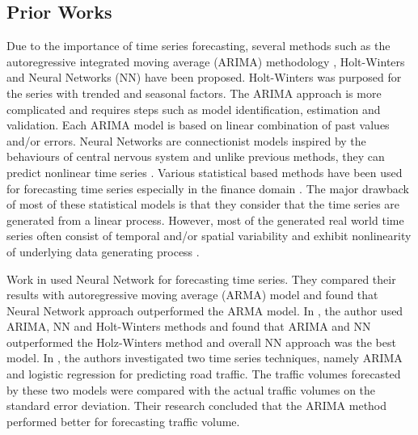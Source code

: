     \subsection{Prior Works}
    \indent
    Due to the importance of time series forecasting, several methods  such as the autoregressive integrated moving average (ARIMA) methodology \cite{TSanalysis}, Holt-Winters \cite{HOLT20045} and Neural Networks (NN) \cite{nonLinearSigProcessingNN, paulo} have been proposed. Holt-Winters was purposed for the series with trended and seasonal factors. The ARIMA approach is more complicated and requires steps such as model identification, estimation and validation. Each ARIMA model is based on linear combination of past values and/or errors. Neural Networks are connectionist models inspired by the behaviours of central nervous system and unlike previous methods, they can predict nonlinear time series \cite{Cortez06internettraffic}. Various statistical based methods have been used for forecasting time series especially in the finance domain \cite{methodsapplications}. The major drawback of most of these statistical models is that they consider that the time series are  generated from a linear process. However, most of the generated real world time series often consist of temporal and/or spatial variability and exhibit nonlinearity of underlying data generating process \cite{Panigrahi_timeseries}.
    
  
  Work in \cite{chakraborty} used Neural Network for forecasting time series. They compared their results with autoregressive moving average (ARMA)  model and found that Neural Network approach outperformed the ARMA model. In \cite{nonLinearSigProcessingNN}, the author used ARIMA, NN and Holt-Winters methods and found that ARIMA and NN outperformed the Holz-Winters method and overall NN approach was the best model. In \cite{comparisonREGARIMA}, the authors investigated two time series techniques, namely ARIMA and logistic regression for predicting road traffic. The traffic volumes forecasted  by these two models were compared with the actual traffic volumes on the standard error deviation. Their research concluded that the ARIMA method performed better for forecasting traffic volume. 

